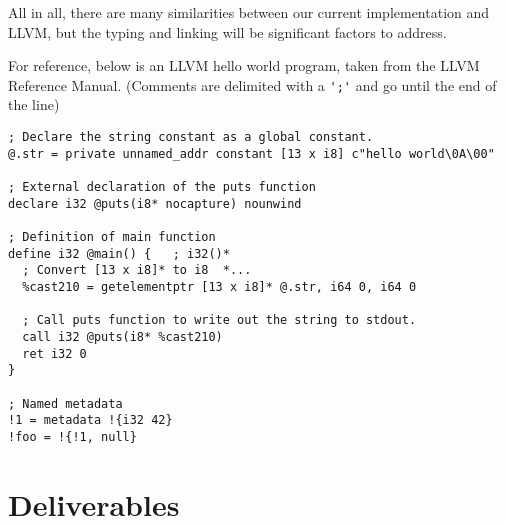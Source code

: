 \documentclass[11pt]{article}
\begin{document}
All in all, there are many similarities between our current implementation and LLVM, but the typing and
linking will be significant factors to address.

For reference, below is an LLVM hello world program, taken from the LLVM Reference Manual.
(Comments are delimited with a \verb|';'| and go until the end of the line)\\
\begin{lstlisting}
; Declare the string constant as a global constant. 
@.str = private unnamed_addr constant [13 x i8] c"hello world\0A\00" 

; External declaration of the puts function 
declare i32 @puts(i8* nocapture) nounwind 

; Definition of main function
define i32 @main() {   ; i32()*  
  ; Convert [13 x i8]* to i8  *... 
  %cast210 = getelementptr [13 x i8]* @.str, i64 0, i64 0

  ; Call puts function to write out the string to stdout. 
  call i32 @puts(i8* %cast210)
  ret i32 0 
}

; Named metadata
!1 = metadata !{i32 42}
!foo = !{!1, null}
\end{lstlisting}


\section{Deliverables}



\nocite{*}


\end{document}
